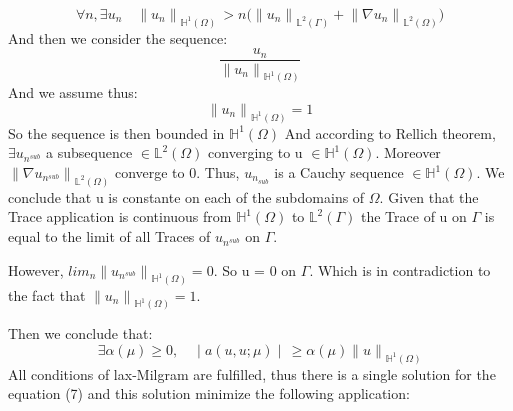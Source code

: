$$\forall n, \exists u_n  \quad {\lVert{u_n}\rVert}_{\mathbb{H}^1(\Omega)} \,>  n\big(
{\lVert{u_n}\rVert}_{\mathbb{L}^2(\Gamma)}
+
{\lVert{\nabla u_n}\rVert}_{\mathbb{L}^2(\Omega)}
\big)$$
And then we consider the sequence:
$$\frac {u_n} {{\lVert{u_n}\rVert}_{\mathbb{H}^1(\Omega)}}$$
And we assume thus:
$${\lVert{u_n}\rVert}_{\mathbb{H}^1(\Omega)}=1$$
So the sequence is then bounded in ${\mathbb{H}^1(\Omega)}$ 
And according to Rellich theorem, $\exists u_{n^{sub}}$ a subsequence $\in \mathbb{L}^2(\Omega)$ converging to u $\in \mathbb{H}^1(\Omega)$. Moreover ${\lVert{\nabla u_{n^{sub}}\rVert}_{\mathbb{L}^2(\Omega)}}$ converge to 0.
Thus, $u_{n_{sub}}$ is a Cauchy sequence $\in \mathbb{H}^1(\Omega)$.
We conclude that u is constante on each of the subdomains of $\Omega$. Given that the Trace application is continuous from $ \mathbb{H}^1(\Omega)$ to  $ \mathbb{L}^2(\Gamma)$ the Trace of u on $\Gamma$ is equal to the limit of all Traces of $u_{n^{sub}}$ on $\Gamma$. 

However, $lim_n  {\lVert{u_{n^{sub}}}\rVert}_{\mathbb{H}^1(\Omega)}=0$. So u = 0 on $\Gamma$. Which is in contradiction to the fact that ${{\lVert{u_n}\rVert}_{\mathbb{H}^1(\Omega)}}=1$.

Then we conclude that:
$$ \exists \alpha(\mu)  \geq 0, \quad \mid a(u, u; \mu)\mid \,\geq \alpha(\mu){\lVert{u}\rVert}_{\mathbb{H}^1(\Omega)}$$
All conditions of lax-Milgram are fulfilled, thus there is a single solution for the equation (7) and this solution minimize the following application:



















